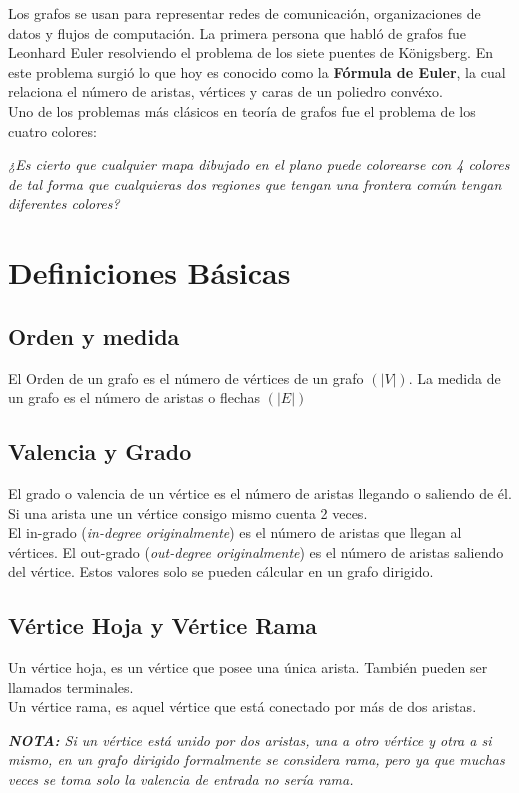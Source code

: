 \documentclass[11pt]{article}
\theoremstyle{plain}
\begin{document}
        Los grafos se usan para representar redes de comunicación, organizaciones de datos y flujos de computación. La primera persona que habló de grafos fue Leonhard Euler resolviendo el problema de los siete puentes de Königsberg. En este problema surgió lo que hoy es conocido como la \textbf{Fórmula de Euler}, la cual relaciona el número de aristas, vértices y caras de un poliedro convéxo.\\

        Uno de los problemas más clásicos en teoría de grafos fue el problema de los cuatro colores:

        \begin{center}
            \textit{¿Es cierto que cualquier mapa dibujado en el plano puede colorearse con 4 colores de tal forma que cualquieras dos regiones que tengan una frontera común tengan diferentes colores?}
        \end{center}
    \section{Definiciones Básicas} %
    \label{sec:definiciones_básicas}
        \subsection{Orden y medida} %
        \label{sub:orden_y_medida}
            El Orden de un grafo es el número de vértices de un grafo $(|V|)$. La medida de un grafo es el número de aristas o flechas $(|E|)$
        \subsection{Valencia y Grado} %
        \label{sub:valencia_y_grado}
            El grado o valencia de un vértice es el número de aristas llegando o saliendo de él. Si una arista une un vértice consigo mismo cuenta 2 veces.\\

            El in-grado (\textit{in-degree originalmente}) es el número de aristas que llegan al vértices. El out-grado (\textit{out-degree originalmente}) es el número de aristas saliendo del vértice. Estos valores solo se pueden cálcular en un grafo dirigido.
        \subsection{Vértice Hoja y Vértice Rama} %
        \label{sub:vértice_hoja}
            Un vértice hoja, es un vértice que posee una única arista. También pueden ser llamados terminales.\\
            Un vértice rama, es aquel vértice que está conectado por más de dos aristas.
            \begin{center}
                \textit{\textbf{NOTA:} Si un vértice está unido por dos aristas, una a otro vértice y otra a si mismo, en un grafo dirigido formalmente se considera rama, pero ya que muchas veces se toma solo la valencia de entrada no sería rama.}
            \end{center}
\end{document}
